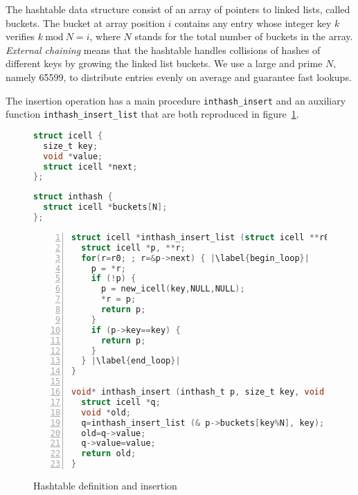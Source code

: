 \documentclass[11pt]{article}
\def\ce{\lstinline[language=C, breaklines=true, columns=fixed]}
\begin{document}
{The hashtable data structure consist of an array of pointers to linked lists, called buckets. The bucket at array position $i$ contains any entry whose integer key $k$ verifies $k\ \mathrm{mod}\ N = i$, where $N$ stands for the total number of buckets in the array. \emph{External chaining} means that the hashtable handles collisions of hashes of different keys by growing the linked list buckets.
We use a large and prime $N$, namely 65599, to distribute entries evenly on average and guarantee fast lookups.

The insertion operation has a main procedure \ce{inthash_insert} and an auxiliary function \break\ce{inthash_insert_list} that are both reproduced in figure~\ref{inthash_insert}.

\begin{figure}
\begin{minipage}{0.5\textwidth}
\begin{lstlisting}[language=C,basicstyle=\small]
struct icell {
  size_t key;
  void *value;
  struct icell *next;
};
\end{lstlisting}
\end{minipage}\hfill
\begin{minipage}{0.5\textwidth}
\begin{lstlisting}[language=C, basicstyle=\small]
struct inthash {
  struct icell *buckets[N];
};
\end{lstlisting}
\end{minipage}
\begin{lstlisting}[language=C,basicstyle=\small, numbers=left, escapechar=|]
struct icell *inthash_insert_list (struct icell **r0, size_t key) {
  struct icell *p, **r;
  for(r=r0; ; r=&p->next) { |\label{begin_loop}|
    p = *r;
    if (!p) {
      p = new_icell(key,NULL,NULL);
      *r = p;
      return p;
    }
    if (p->key==key) {
      return p;
    }
  } |\label{end_loop}|
}

void* inthash_insert (inthash_t p, size_t key, void *value) {
  struct icell *q;
  void *old;
  q=inthash_insert_list (& p->buckets[key%N], key);
  old=q->value;
  q->value=value;
  return old;
}
\end{lstlisting}
\caption{Hashtable definition and insertion}
\label{inthash_insert}
\end{figure}

\begin{figure}
\end{figure}}
\end{document}
